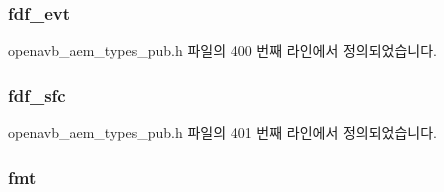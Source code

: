 \subsubsection[{\texorpdfstring{fdf\+\_\+evt}{fdf_evt}}]{ fdf\+\_\+evt}\hypertarget{structopenavb__aem__stream__format__iec__61883__6__am824__t_a5face0fe6e253b8041386eaa28f73800}{}\label{structopenavb__aem__stream__format__iec__61883__6__am824__t_a5face0fe6e253b8041386eaa28f73800}


openavb\+\_\+aem\+\_\+types\+\_\+pub.\+h 파일의 400 번째 라인에서 정의되었습니다.

\subsubsection[{\texorpdfstring{fdf\+\_\+sfc}{fdf_sfc}}]{ fdf\+\_\+sfc}\hypertarget{structopenavb__aem__stream__format__iec__61883__6__am824__t_a637053a40379dcc42801b92779cd870e}{}\label{structopenavb__aem__stream__format__iec__61883__6__am824__t_a637053a40379dcc42801b92779cd870e}


openavb\+\_\+aem\+\_\+types\+\_\+pub.\+h 파일의 401 번째 라인에서 정의되었습니다.

\subsubsection[{\texorpdfstring{fmt}{fmt}}]{ fmt}\hypertarget{structopenavb__aem__stream__format__iec__61883__6__am824__t_ab88030d1822b822615cede2168f1c31e}{}\label{structopenavb__aem__stream__format__iec__61883__6__am824__t_ab88030d1822b822615cede2168f1c31e}


